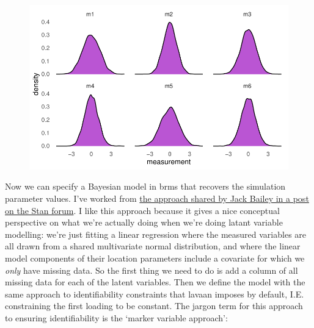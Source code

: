 \documentclass[
  letterpaper,
  DIV=11,
  numbers=noendperiod]{scrreprt}
\begin{document}
\begin{figure}[H]

{\centering \includegraphics{./bayesian-cfa_files/figure-pdf/unnamed-chunk-3-1.pdf}

}

\end{figure}

Now we can specify a Bayesian model in brms that recovers the simulation
parameter values. I've worked from
\href{https://discourse.mc-stan.org/t/confirmatory-factor-analysis-using-brms/23139}{the
approach shared by Jack Bailey in a post on the Stan forum}. I like this
approach because it gives a nice conceptual perspective on what we're
actually doing when we're doing latant variable modelling: we're just
fitting a linear regression where the measured variables are all drawn
from a shared multivariate normal distribution, and where the linear
model components of their location parameters include a covariate for
which we \emph{only} have missing data. So the first thing we need to do
is add a column of all missing data for each of the latent variables.
Then we define the model with the same approach to identifiability
constraints that lavaan imposes by default, I.E. constraining the first
loading to be constant. The jargon term for this approach to ensuring
identifiability is the `marker variable approach':
\end{document}
